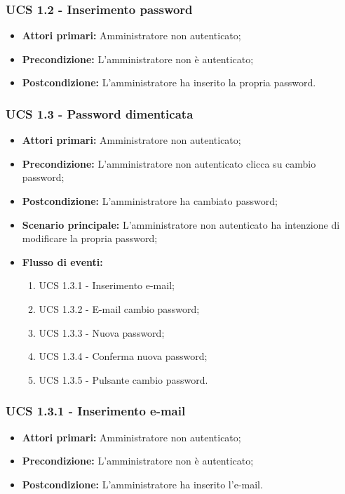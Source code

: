 \subsubsection{UCS 1.2 - Inserimento password}%
\begin{itemize}
\item \textbf{Attori primari:} Amministratore non autenticato;
\item \textbf{Precondizione:} L'amministratore non è autenticato;
\item \textbf{Postcondizione:} L'amministratore ha inserito la propria password.
\end{itemize}

\subsubsection{UCS 1.3 - Password dimenticata}%
\begin{itemize}
\item \textbf{Attori primari:} Amministratore non autenticato;
\item \textbf{Precondizione:}  L'amministratore non autenticato clicca su cambio password;
\item \textbf{Postcondizione:} L'amministratore ha cambiato password;
\item \textbf{Scenario principale:} L'amministratore non autenticato ha intenzione di modificare la propria password;
\item \textbf{Flusso di eventi:}
    \begin{enumerate}
        \item UCS 1.3.1 - Inserimento e-mail;
        \item UCS 1.3.2 - E-mail cambio password;
        \item UCS 1.3.3 - Nuova password;
        \item UCS 1.3.4 - Conferma nuova password;
        \item UCS 1.3.5 - Pulsante cambio password.
    \end{enumerate}
\end{itemize}

\subsubsection{UCS 1.3.1 - Inserimento e-mail}
\begin{itemize}
\item \textbf{Attori primari:} Amministratore non autenticato;
\item \textbf{Precondizione:} L'amministratore non è autenticato; %
\item \textbf{Postcondizione:} L'amministratore ha inserito l'e-mail.
\end{itemize}

